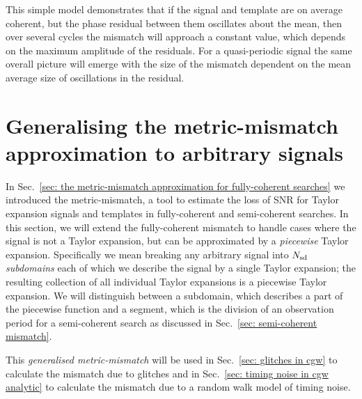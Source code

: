 \documentclass[../full_thesis/full_thesis.tex]{subfiles}
\begin{document}
This simple model demonstrates that if the signal and template are on average
coherent, but the phase residual between them oscillates about the mean, then
over several cycles the mismatch will approach a constant value, which depends on
the maximum amplitude of the residuals.  For a quasi-periodic signal the same
overall picture will emerge with the size of the mismatch dependent on the mean
average size of oscillations in the residual.

\section{Generalising the metric-mismatch approximation to arbitrary signals}
\label{sec: generalising the metric-mismatch}
In Sec.~\ref{sec: the metric-mismatch approximation for fully-coherent searches}
we introduced the metric-mismatch, a tool to estimate
the loss of SNR for Taylor expansion signals and templates in fully-coherent
and semi-coherent searches. In this section, we will extend the fully-coherent
mismatch to handle cases where the signal is not a Taylor expansion, but can
be approximated by a \emph{piecewise} Taylor expansion. Specifically we mean
breaking any arbitrary signal into $N_{\textrm{sd}}$ \emph{subdomains} each of which we
describe the signal by a single Taylor expansion; the resulting collection of
all individual Taylor expansions is a piecewise Taylor expansion. We will
distinguish between a subdomain, which describes a part of the piecewise
function and a segment, which is the division of an observation period for a
semi-coherent search as discussed in Sec.~\ref{sec: semi-coherent mismatch}. 

This \emph{generalised metric-mismatch} will be used in Sec.~\ref{sec: glitches
in cgw} to calculate the mismatch due to glitches and in Sec.~\ref{sec: timing
noise in cgw analytic} to calculate the mismatch due to a random walk model of
timing noise.


\end{document}
